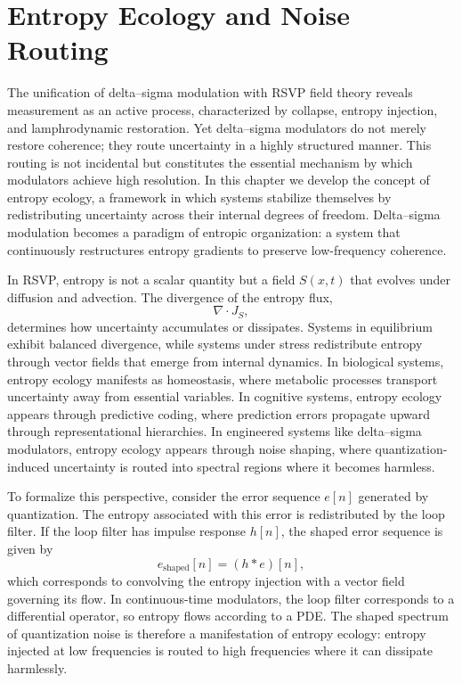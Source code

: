 
\chapter{Entropy Ecology and Noise Routing}

The unification of delta–sigma modulation with RSVP field theory reveals measurement as an active process, characterized by collapse, entropy injection, and lamphrodynamic restoration. Yet delta–sigma modulators do not merely restore coherence; they route uncertainty in a highly structured manner. This routing is not incidental but constitutes the essential mechanism by which modulators achieve high resolution. In this chapter we develop the concept of entropy ecology, a framework in which systems stabilize themselves by redistributing uncertainty across their internal degrees of freedom. Delta–sigma modulation becomes a paradigm of entropic organization: a system that continuously restructures entropy gradients to preserve low-frequency coherence.

In RSVP, entropy is not a scalar quantity but a field \(S(x,t)\) that evolves under diffusion and advection. The divergence of the entropy flux,
\[
\nabla \cdot J_{S},
\]
determines how uncertainty accumulates or dissipates. Systems in equilibrium exhibit balanced divergence, while systems under stress redistribute entropy through vector fields that emerge from internal dynamics. In biological systems, entropy ecology manifests as homeostasis, where metabolic processes transport uncertainty away from essential variables. In cognitive systems, entropy ecology appears through predictive coding, where prediction errors propagate upward through representational hierarchies. In engineered systems like delta–sigma modulators, entropy ecology appears through noise shaping, where quantization-induced uncertainty is routed into spectral regions where it becomes harmless.

To formalize this perspective, consider the error sequence \(e[n]\) generated by quantization. The entropy associated with this error is redistributed by the loop filter. If the loop filter has impulse response \(h[n]\), the shaped error sequence is given by
\[
e_{\mathrm{shaped}}[n] = (h * e)[n],
\]
which corresponds to convolving the entropy injection with a vector field governing its flow. In continuous-time modulators, the loop filter corresponds to a differential operator, so entropy flows according to a PDE. The shaped spectrum of quantization noise is therefore a manifestation of entropy ecology: entropy injected at low frequencies is routed to high frequencies where it can dissipate harmlessly.

